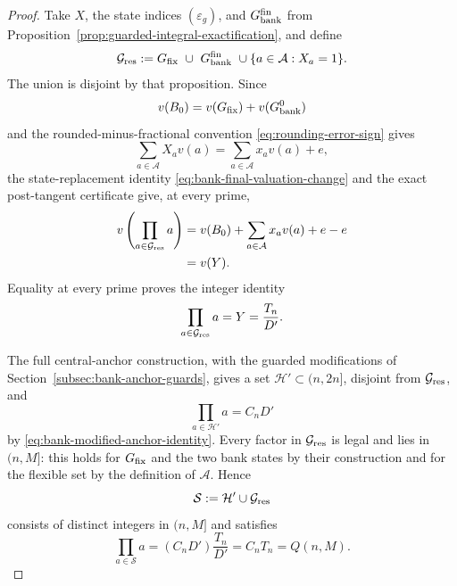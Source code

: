 \documentclass[11pt]{article}
\numberwithin{equation}{section}
\theoremstyle{definition}
\theoremstyle{remark}
\newcommand{\1}{\mathbf 1}
\begin{document}
\begin{proof}
Take \(X\), the state indices \((\varepsilon_g)\), and
\(G_{\rm bank}^{\rm fin}\) from
Proposition~\ref{prop:guarded-integral-exactification}, and define
\begin{equation}
 \mathcal G_{\rm res}:=
 G_{\rm fix}\ \cup\ G_{\rm bank}^{\rm fin}\
 \cup\{a\in\mathcal A:X_a=1\}.
\label{eq:final-residual-set}
\end{equation}
The union is disjoint by that proposition.  Since
\[
 v(B_0)=v(G_{\rm fix})+v(G_{\rm bank}^0)
\]
and the rounded-minus-fractional convention
\eqref{eq:rounding-error-sign} gives
\[
 \sum_{a\in\mathcal A}X_av(a)
 =\sum_{a\in\mathcal A}x_av(a)+e,
\]
the state-replacement identity
\eqref{eq:bank-final-valuation-change} and the exact post-tangent
certificate give, at every prime,
\begin{align}
 v\left(\prod_{a\in\mathcal G_{\rm res}}a\right)
 &=v(B_0)+\sum_{a\in\mathcal A}x_av(a)+e-e \notag\\
 &=v(Y).
 \label{eq:final-residual-valuations}
\end{align}
Equality at every prime proves the integer identity
\begin{equation}
                    \prod_{a\in\mathcal G_{\rm res}}a
                    =Y=\frac{T_n}{D'}.
\label{eq:final-residual-product}
\end{equation}

The full central-anchor construction, with the guarded modifications of
Section~\ref{subsec:bank-anchor-guards}, gives a set
\(\mathcal H'\subset(n,2n]\), disjoint from
\(\mathcal G_{\rm res}\), and
\[
                         \prod_{a\in\mathcal H'}a=C_nD'
\]
by \eqref{eq:bank-modified-anchor-identity}.  Every factor in
\(\mathcal G_{\rm res}\) is legal and lies in \((n,M]\): this holds for
\(G_{\rm fix}\) and the two bank states by their construction and for
the flexible set by the definition of \(\mathcal A\).  Hence
\begin{equation}
                    \mathcal S:=\mathcal H'\cup\mathcal G_{\rm res}
 \label{eq:final-complement-subset}
\end{equation}
consists of distinct integers in \((n,M]\) and satisfies
\begin{equation}
 \prod_{a\in\mathcal S}a
  =(C_nD')\frac{T_n}{D'}
  =C_nT_n
  =Q(n,M).
 \label{eq:final-complement-product}
\end{equation}
\end{proof}
\end{document}
